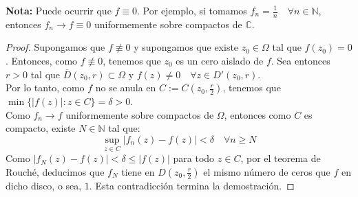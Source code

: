 \textbf{Nota:} Puede ocurrir que $f \equiv 0$. Por ejemplo, si tomamos $f_n = \frac{1}{n} \quad \forall n \in \mathbb{N}$, entonces $f_n \to f \equiv 0$ uniformemente sobre compactos de $\mathbb{C}$.

\begin{proof}
    Supongamos que $f \not \equiv 0$ y supongamos que existe $z_0 \in \Omega$ tal que $f(z_0) = 0$. Entonces, como $f \not \equiv 0$, tenemos que $z_0$ es un cero aislado de $f$. Sea entonces $r > 0$ tal que $\overline{D}(z_0, r) \subset \Omega$ y $f(z) \neq 0 \quad \forall z \in D'(z_0, r)$.\\
    Por lo tanto, como $f$ no se anula en $C := C(z_0, \frac{r}{2})$, tenemos que $\min \{|f(z)| : z \in C\} = \delta > 0$.\\
    Como $f_n \to f$ uniformemente sobre compactos de $\Omega$, entonces como $C$ es compacto, existe $N \in \mathbb{N}$ tal que:
    \[
        \sup_{z \in C} |f_n(z) - f(z)| < \delta \quad \forall n \geq N
    \]
    Como $|f_N(z) - f(z)| < \delta \leq |f(z)|$ para todo $z \in C$, por el teorema de Rouché, deducimos que $f_N$ tiene en $D(z_0, \frac{r}{2})$ el mismo número de ceros que $f$ en dicho disco, o sea, $1$. Esta contradicción termina la demostración. 
\end{proof}



